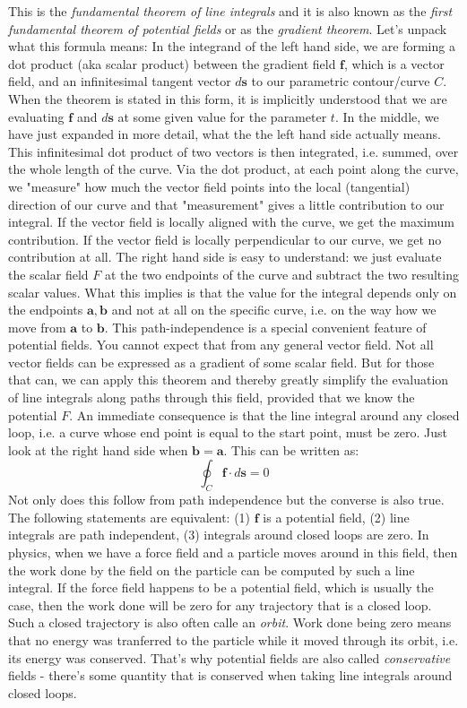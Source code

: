 This is the \emph{fundamental theorem of line integrals} and it is also known as the \emph{first fundamental theorem of potential fields} or as the \emph{gradient theorem}. Let's unpack what this formula means: In the integrand of the left hand side, we are forming a dot product (aka scalar product) between the gradient field $\mathbf{f}$, which is a vector field, and an infinitesimal tangent vector $d\mathbf{s}$ to our parametric contour/curve $C$. When the theorem is stated in this form, it is implicitly understood that we are evaluating $\mathbf{f}$ and $d\mathbf{s}$ at some given value for the parameter $t$. In the middle, we have just expanded in more detail, what the the left hand side actually means. This infinitesimal dot product of two vectors is then integrated, i.e. summed, over the whole length of the curve. Via the dot product, at each point along the curve, we "measure" how much the vector field points into the local (tangential) direction of our curve and that "measurement" gives a little contribution to our integral. If the vector field is locally aligned with the curve, we get the maximum contribution. If the vector field is locally perpendicular to our curve, we get no contribution at all. The right hand side is easy to understand: we just evaluate the scalar field $F$ at the two endpoints of the curve and subtract the two resulting scalar values. What this implies is that the value for the integral depends only on the endpoints $\mathbf{a,b}$ and not at all on the specific curve, i.e. on the way how we move from $\mathbf{a}$ to $\mathbf{b}$. This path-independence is a special convenient feature of potential fields. You cannot expect that from any general vector field. Not all vector fields can be expressed as a gradient of some scalar field. But for those that can, we can apply this theorem and thereby greatly simplify the evaluation of line integrals along paths through this field, provided that we know the potential $F$. An immediate consequence is that the line integral around any closed loop, i.e. a curve whose end point is equal to the start point, must be zero. Just look at the right hand side when $\mathbf{b = a}$. This can be written as:
\begin{equation}
\oint_C \mathbf{f} \cdot d\mathbf{s} = 0
\end{equation}
Not only does this follow from path independence but the converse is also true. The following statements are equivalent: (1) $\mathbf{f}$ is a potential field, (2) line integrals are path independent, (3) integrals around closed loops are zero. In physics, when we have a force field and a particle moves around in this field, then the work done by the field on the particle can be computed by such a line integral. If the force field happens to be a potential field, which is usually the case, then the work done will be zero for any trajectory that is a closed loop. Such a closed trajectory is also often calle an \emph{orbit}. Work done being zero means that no energy was tranferred to the particle while it moved through its orbit, i.e. its energy was conserved. That's why potential fields are also called \emph{conservative} fields - there's some quantity that is conserved when taking line integrals around closed loops. 

